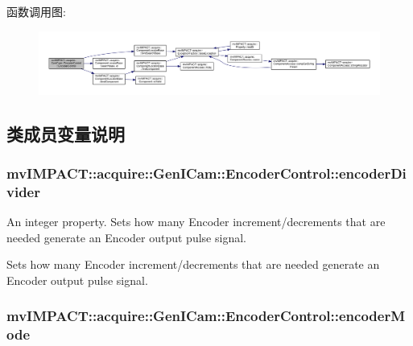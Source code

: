函数调用图\+:
\nopagebreak
\begin{figure}[H]
\begin{center}
\leavevmode
\includegraphics[width=350pt]{classmv_i_m_p_a_c_t_1_1acquire_1_1_gen_i_cam_1_1_encoder_control_a33339c7f0b709d90dfdad3be7c0b6c37_cgraph}
\end{center}
\end{figure}




\subsection{类成员变量说明}
\hypertarget{classmv_i_m_p_a_c_t_1_1acquire_1_1_gen_i_cam_1_1_encoder_control_aad764e7913eb8f8ce1b8ba247a17b34a}{
\subsubsection[{encoder\+Divider}]{ mv\+I\+M\+P\+A\+C\+T\+::acquire\+::\+Gen\+I\+Cam\+::\+Encoder\+Control\+::encoder\+Divider}}\label{classmv_i_m_p_a_c_t_1_1acquire_1_1_gen_i_cam_1_1_encoder_control_aad764e7913eb8f8ce1b8ba247a17b34a}


An integer property. Sets how many Encoder increment/decrements that are needed generate an Encoder output pulse signal. 

Sets how many Encoder increment/decrements that are needed generate an Encoder output pulse signal. \hypertarget{classmv_i_m_p_a_c_t_1_1acquire_1_1_gen_i_cam_1_1_encoder_control_a6825f0b4f99463f39de11401c67fb67e}{
\subsubsection[{encoder\+Mode}]{ mv\+I\+M\+P\+A\+C\+T\+::acquire\+::\+Gen\+I\+Cam\+::\+Encoder\+Control\+::encoder\+Mode}}\label{classmv_i_m_p_a_c_t_1_1acquire_1_1_gen_i_cam_1_1_encoder_control_a6825f0b4f99463f39de11401c67fb67e}


